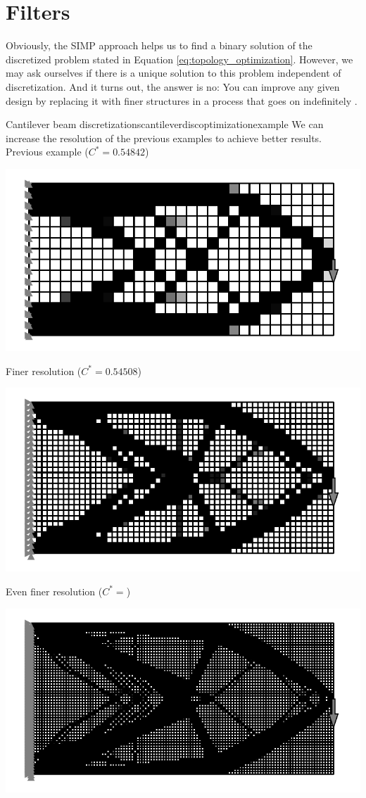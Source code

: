 \section{Filters}
Obviously, the SIMP approach helps us to find a binary solution of the discretized problem stated in Equation \eqref{eq:topology_optimization}. However, we may ask ourselves if there is a unique solution to this problem independent of discretization. And it turns out, the answer is no: You can improve any given design by replacing it with finer structures in a process that goes on indefinitely \cite{Christensen2008}. 

\begin{example}{Cantilever beam discretizations}{cantileverdiscoptimizationexample}
    We can increase the resolution of the previous examples to achieve better results. 
    Previous example ($C^*=0.54842$)
    \begin{center}
        \includegraphics[width=0.5\linewidth]{figures/cantilever_fem_optimized_binary.pdf}
    \end{center}
    Finer resolution ($C^*=0.54508$)
    \begin{center}
        \includegraphics[width=0.5\linewidth]{figures/cantilever_fem_optimized_binary_fine.pdf}
    \end{center}
    Even finer resolution ($C^*=$)
    \begin{center}
        \includegraphics[width=0.5\linewidth]{figures/cantilever_fem_optimized_binary_extra_fine.pdf}
    \end{center}
\end{example}

